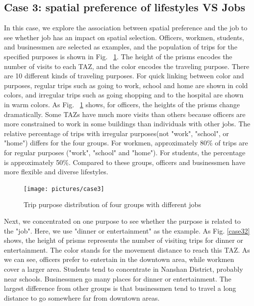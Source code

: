 \documentclass{ieeeaccess}
\begin{document}
\subsection{Case 3: spatial preference of lifestyles VS Jobs}
In this case, we explore the association between spatial preference and the job to see whether job has an impact on spatial selection. Officers, workmen, students, and businessmen are selected as examples, and the population of trips for the specified purposes is shown in Fig. ~\ref{case3}. The height of the prisms encodes the number of visits to each TAZ, and the color encodes the traveling purpose. There are 10 different kinds of traveling purposes. For quick linking between color and purposes, regular trips such as going to work, school and home are shown in cold colors, and irregular trips such as going shopping and to the hospital are shown in warm colors. As Fig. ~\ref{case3} shows, for officers, the heights of the prisms change dramatically. Some TAZs have much more visits than others because officers are more constrained to work in some buildings than individuals with other jobs. The relative percentage of trips with irregular purposes(not "work", "school", or "home") differs for the four groups. For workmen, approximately 80\% of trips are for regular purposes ("work", "school" and "home"). For students, the percentage is approximately 50\%. Compared to these groups, officers and businessmen have more flexible and diverse lifestyles.

\begin{figure}[htb!]
 \centering %
 \texttt{[image: pictures/case3]}
 \caption{Trip purpose distribution of four groups with different jobs}
 \label{case3}
\end{figure}

Next, we concentrated on one purpose to see whether the purpose is related to the "job". Here, we use "dinner or entertainment" as the example. As Fig. \ref{case32} shows, the height of prisms represents the number of visiting trips for dinner or entertainment. The color stands for the movement distance to reach this TAZ. As we can see, officers prefer to entertain in the downtown area, while workmen cover a larger area. Students tend to concentrate in Nanshan District, probably near schools. Businessmen go many places for dinner or entertainment. The largest difference from other groups is that businessmen tend to travel a long distance to go somewhere far from downtown areas.
\end{document}

